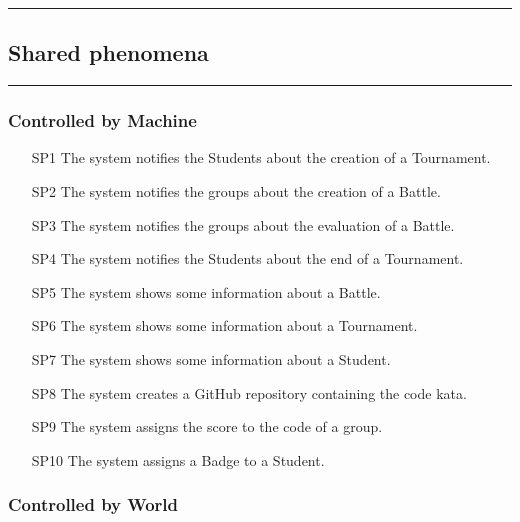 \documentclass{Configuration_Files/Template}
\begin{document}
{\color{bluepoli}\rule{\linewidth}{0.1pt}}

\subsection{Shared phenomena}

{\color{bluepoli}\rule{\linewidth}{0.1pt}}

\subsubsection{Controlled by Machine}

\begin{enumerate}
    \item[\textcolor{bluepoli}{SP1}] The system notifies the Students about the creation of a Tournament.
    \item[\textcolor{bluepoli}{SP2}] The system notifies the groups about the creation of a Battle.
    \item[\textcolor{bluepoli}{SP3}] The system notifies the groups about the evaluation of a Battle.
    \item[\textcolor{bluepoli}{SP4}] The system notifies the Students about the end of a Tournament.
    \item[\textcolor{bluepoli}{SP5}] The system shows some information about a Battle.
    \item[\textcolor{bluepoli}{SP6}] The system shows some information about a Tournament.
    \item[\textcolor{bluepoli}{SP7}] The system shows some information about a Student.
    \item[\textcolor{bluepoli}{SP8}] The system creates a GitHub repository containing the code kata.
    \item[\textcolor{bluepoli}{SP9}] The system assigns the score to the code of a group.
    \item[\textcolor{bluepoli}{SP10}] The system assigns a Badge to a Student.
\end{enumerate}

\subsubsection{Controlled by World}
\end{document}
